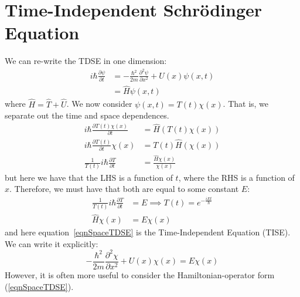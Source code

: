 \documentclass[../Main.tex]{subfiles}
\begin{document}
\section{Time-Independent Schr\"odinger Equation}
We can re-write the TDSE in one dimension:
\begin{align*}
    i\hbar \frac{\partial \psi}{\partial t} &= -\frac{\hbar^2}{2m} \frac{\partial^{2}\psi}{\partial x^{2}} + U(x) \psi(x, t) \\
    &= \hat{H} \psi(x, t)
\end{align*}
where $\hat{H} = \hat{T} + \hat{U}$. We now consider $\psi(x, t) = T(t)\chi(x)$. That is, we separate out the time and space dependences.
\begin{align*}
    i\hbar \frac{\partial T(t)\chi(x)}{\partial t} &= \hat{H}(T(t)\chi(x)) \\
    i\hbar \frac{\partial T(t)}{\partial t}\chi(x) &= T(t)\hat{H}(\chi(x)) \\
    \frac{1}{T(t)} i\hbar \frac{\partial T}{\partial t} &= \frac{\hat{H} \chi(x)}{\chi(x)}
\end{align*}
but here we have that the LHS is a function of $t$, where the RHS is a function of $x$. Therefore, we must have that both are equal to some constant $E$:
\begin{align}
    \frac{1}{T(t)} i\hbar \frac{\partial T}{\partial t} &= E \implies T(t) = e^{-\frac{iEt}{\hbar}} \label{eqnTimeTDSE} \\
    \hat{H} \chi(x) &= E\chi(x) \label{eqnSpaceTDSE}
\end{align}
and here equation~\ref{eqnSpaceTDSE} is the Time-Independent \schr Equation (TISE). We can write it explicitly:
\begin{equation}
    -\frac{\hbar^2}{2m} \frac{\partial^{2}\chi}{\partial x^{2}} + U(x) \chi(x) = E\chi(x)
    \label{eqnTISE}
\end{equation}
However, it is often more useful to consider the Hamiltonian-operator form (\ref{eqnSpaceTDSE}).
\end{document}
